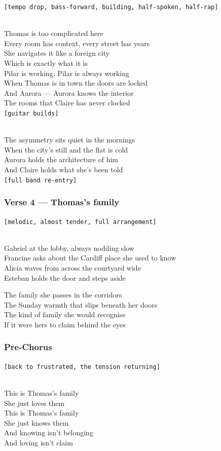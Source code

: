 \texttt{{[}tempo\ drop,\ bass-forward,\ building,\ half-spoken,\ half-rap{]}}\strut \\
Thomas is too complicated here\\
Every room has context, every street has years\\
She navigates it like a foreign city\\
Which is exactly what it is\\
Pilar is working, Pilar is always working\\
When Thomas is in town the doors are locked\\
And Aurora --- Aurora knows the interior\\
The rooms that Claire has never clocked\\
\texttt{{[}guitar\ builds{]}}\strut \\
The asymmetry sits quiet in the mornings\\
When the city's still and the flat is cold\\
Aurora holds the architecture of him\\
And Claire holds what she's been told\\
\texttt{{[}full\ band\ re-entry{]}}

\subsubsection{Verse 4 --- Thomas's
family}\label{verse-4-thomass-family}

\texttt{{[}melodic,\ almost\ tender,\ full\ arrangement{]}}\strut \\
Gabriel at the lobby, always nodding slow\\
Francine asks about the Cardiff place she used to know\\
Alicia waves from across the courtyard wide\\
Esteban holds the door and steps aside

The family she passes in the corridors\\
The Sunday warmth that slips beneath her doors\\
The kind of family she would recognise\\
If it were hers to claim behind the eyes

\subsubsection{Pre-Chorus}\label{pre-chorus-62}

\texttt{{[}back\ to\ frustrated,\ the\ tension\ returning{]}}\strut \\
This is Thomas's family\\
She just loves them\\
This is Thomas's family\\
She just knows them\\
And knowing isn't belonging\\
And loving isn't claim

